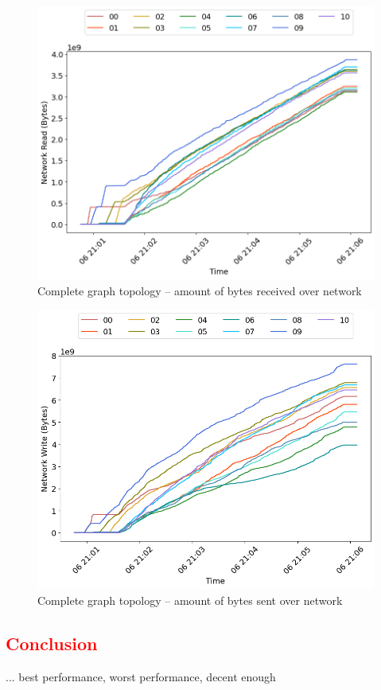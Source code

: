 \begin{minipage}{0.5\linewidth}
\begin{figure}[H]
\captionsetup{justification=centering,width=0.8\linewidth}
\includegraphics[width=\linewidth]{figures/graph-complete/net_read.png}
\caption{Complete graph topology -- amount of bytes received over network}
\label{fig:graph-complete-cpu_usage}
\end{figure}
\end{minipage}
\begin{minipage}{0.5\linewidth}
\begin{figure}[H]
\captionsetup{justification=centering,width=0.8\linewidth}
\includegraphics[width=\linewidth]{figures/graph-complete/net_write.png}
\caption{Complete graph topology -- amount of bytes sent over network}
\label{fig:graph-complete-mem_usage}
\end{figure}
\end{minipage}





\subsection{\textcolor{red}{Conclusion}}
...
best performance, worst performance, decent enough



